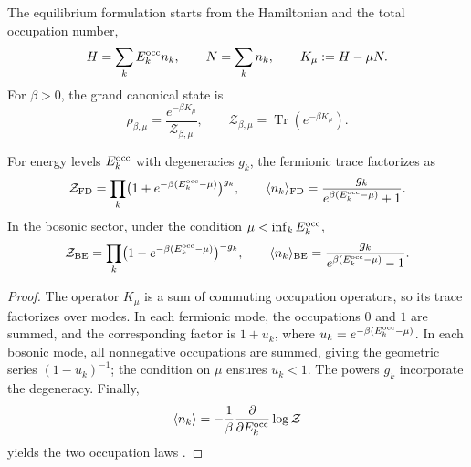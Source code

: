 The equilibrium formulation starts from the Hamiltonian and the total
occupation number,
\begin{equation}
 H=\sum_kE_k^{\rm occ} n_k,
 \qquad
 N=\sum_k n_k,
 \qquad
 K_\mu:=H-\mu N.
 \label{v:rec:eq:hamiltoniano-gran-canonico-rev3}
\end{equation}
For \(\beta>0\), the grand canonical state is
\begin{equation}
 \rho_{\beta,\mu}
 =\frac{e^{-\beta K_\mu}}{\mathcal Z_{\beta,\mu}},
 \qquad
 \mathcal Z_{\beta,\mu}
 =\operatorname{Tr}(e^{-\beta K_\mu}).
 \label{v:rec:eq:estado-gran-canonico-rev3}
\end{equation}

\begin{theorem}
\label{v:rec:thm:factorizacion-gran-canonica-rev3}
For energy levels \(E_k^{\rm occ}\) with degeneracies \(g_k\), the
fermionic trace factorizes as
\begin{equation}
 \mathcal Z_{\rm FD}
 =\prod_k\bigl(1+e^{-\beta(E_k^{\rm occ}-\mu)}\bigr)^{g_k},
 \qquad
 \langle n_k\rangle_{\rm FD}
 =\frac{g_k}{e^{\beta(E_k^{\rm occ}-\mu)}+1}.
 \label{v:rec:eq:factorizacion-fd-rev3}
\end{equation}
In the bosonic sector, under the condition
\(\mu<\inf_kE_k^{\rm occ}\),
\begin{equation}
 \mathcal Z_{\rm BE}
 =\prod_k\bigl(1-e^{-\beta(E_k^{\rm occ}-\mu)}\bigr)^{-g_k},
 \qquad
 \langle n_k\rangle_{\rm BE}
 =\frac{g_k}{e^{\beta(E_k^{\rm occ}-\mu)}-1}.
 \label{v:rec:eq:factorizacion-be-rev3}
\end{equation}
\end{theorem}

\begin{proof}
The operator \(K_\mu\) is a sum of commuting occupation operators, so
its trace factorizes over modes. In each fermionic mode, the
occupations \(0\) and \(1\) are summed, and the corresponding factor is
\(1+u_k\), where
\(u_k=e^{-\beta(E_k^{\rm occ}-\mu)}\). In each bosonic mode, all
nonnegative occupations are summed, giving the geometric series
\((1-u_k)^{-1}\); the condition on \(\mu\) ensures \(u_k<1\). The
powers \(g_k\) incorporate the degeneracy. Finally,
\[
 \langle n_k\rangle
 =-\frac1\beta\frac{\partial}{\partial E_k^{\rm occ}}
   \log\mathcal Z
\]
yields the two occupation laws
\cite{Bose1924,Einstein1924,Fermi1926,Dirac1926,Pathria2011}.
\end{proof}


